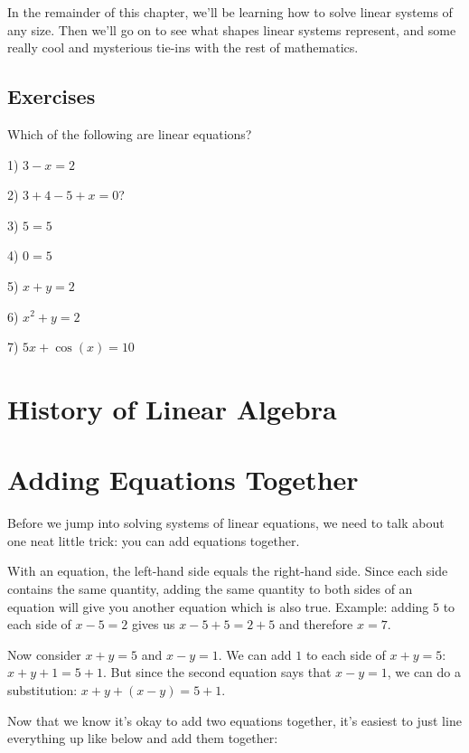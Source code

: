 \documentclass[a4paper,twoside,12pt]{memoir}  %
\begin{document}
In the remainder of this chapter, we'll be learning how to solve linear systems of any size.
Then we'll go on to see what shapes linear systems represent, and some really cool and mysterious tie-ins with the rest of mathematics.

\subsection{Exercises}
Which of the following are linear equations?
\begin{list}{}
\item 1) $3 - x = 2$
\item 2) $3 + 4 -5 + x = 0$?
\item 3) $5 = 5$
\item 4) $0 = 5$
\item 5) $x + y = 2$
\item 6) $x^2 + y = 2$
\item 7) $5x + \cos(x) = 10$
\end{list}

\section{History of Linear Algebra}

\section{Adding Equations Together}
Before we jump into solving systems of linear equations, we need to talk about one neat little trick: you can add equations together.

With an equation, the left-hand side equals the right-hand side. Since each side contains the same quantity, adding the same quantity to both sides of an equation will give you another equation which is also true.
Example: adding $5$ to each side of $x - 5 = 2$ gives us $x - 5 + 5 = 2 + 5$ and therefore $x = 7$.

Now consider $x + y = 5$ and $x - y = 1$. We can add $1$ to each side of $x + y =5$: $x + y + 1 = 5 + 1$.
But since the second equation says that $x - y = 1$, we can do a substitution: $x + y + (x - y) = 5 + 1$.


Now that we know it's okay to add two equations together, it's easiest to just line everything up like below and add them together:

\end{document}

